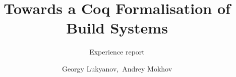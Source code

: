 \documentclass[sigplan]{acmart}\settopmatter{printfolios=true,printccs=false,printacmref=false}
\begin{document}
\title[]{Towards a Coq Formalisation of Build Systems}         %
\subtitle{Experience report}                     %



\author{Georgy Lukyanov,~Andrey Mokhov}

\end{document}
